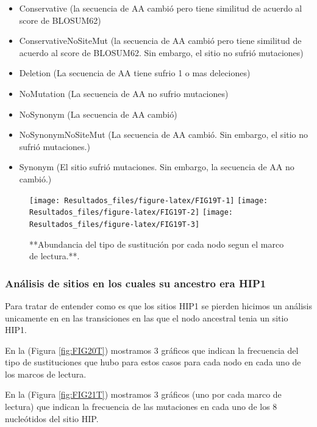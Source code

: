 \documentclass[
]{book}
\providecommand{\tightlist}{%
  \setlength{\itemsep}{0pt}\setlength{\parskip}{0pt}}
\begin{document}
\begin{itemize}
\tightlist
\item
  Conservative (la secuencia de AA cambió pero tiene similitud de acuerdo al score de BLOSUM62)
\item
  ConservativeNoSiteMut (la secuencia de AA cambió pero tiene similitud de acuerdo al score de BLOSUM62. Sin embargo, el sitio no sufrió mutaciones)
\item
  Deletion (La secuencia de AA tiene sufrio 1 o mas deleciones)
\item
  NoMutation (La secuencia de AA no sufrio mutaciones)
\item
  NoSynonym (La secuencia de AA cambió)
\item
  NoSynonymNoSiteMut (La secuencia de AA cambió. Sin embargo, el sitio no sufrió mutaciones.)
\item
  Synonym (El sitio sufrió mutaciones. Sin embargo, la secuencia de AA no cambió.)
\end{itemize}

\begin{figure}

{\centering \texttt{[image: Resultados\_files/figure-latex/FIG19T-1]} \texttt{[image: Resultados\_files/figure-latex/FIG19T-2]} \texttt{[image: Resultados\_files/figure-latex/FIG19T-3]} 

}

\caption{**Abundancia del tipo de sustitución por cada nodo segun el marco de lectura.**.}\label{fig:FIG19T}
\end{figure}

\hypertarget{anuxe1lisis-de-sitios-en-los-cuales-su-ancestro-era-hip1-4}{%
\subsubsection{Análisis de sitios en los cuales su ancestro era HIP1}\label{anuxe1lisis-de-sitios-en-los-cuales-su-ancestro-era-hip1-4}}

Para tratar de entender como es que los sitios HIP1 se pierden hicimos un análisis unicamente en en las transiciones en las que el nodo ancestral tenia un sitio HIP1.

En la (Figura \ref{fig:FIG20T}) mostramos 3 gráficos que indican la frecuencia del tipo de sustituciones que hubo para estos casos para cada nodo en cada uno de los marcos de lectura.

En la (Figura \ref{fig:FIG21T}) mostramos 3 gráficos (uno por cada marco de lectura) que indican la frecuencia de las mutaciones en cada uno de los 8 nucleótidos del sitio HIP.
\end{document}
